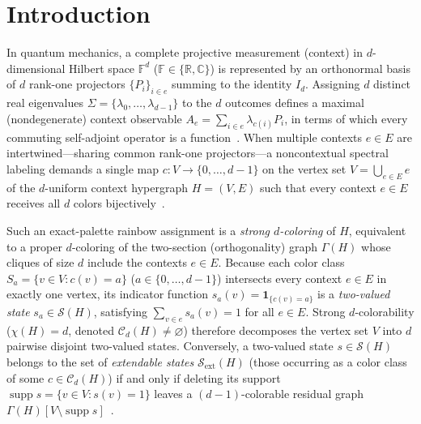 \documentclass[aps,pra,reprint,superscriptaddress,longbibliography,nofootinbib,floatfix,10pt]{revtex4-2}
\theoremstyle{definition}\newtheorem{definition}[theorem]{Definition}
\theoremstyle{remark}\newtheorem{remark}[theorem]{Remark}
\newcommand{\C}{\mathbb C}\newcommand{\R}{\mathbb R}\newcommand{\Q}{\mathbb Q}
\newcommand{\F}{\mathbb F}\newcommand{\Z}{\mathbb Z}\newcommand{\PP}{\mathbb P}
\newcommand{\Sc}{\mathcal S}\newcommand{\Cc}{\mathcal C}
\DeclareMathOperator{\supp}{supp}\DeclareMathOperator{\conv}{conv}
\begin{document}
\maketitle

\section{Introduction}\label{sec:intro}

In quantum mechanics, a complete projective measurement (context) in $d$-dimensional Hilbert space $\F^d$ ($\F\in\{\R,\C\}$) is represented by an orthonormal basis of $d$ rank-one projectors $\{P_i\}_{i\in e}$ summing to the identity $I_d$. Assigning $d$ distinct real eigenvalues $\Sigma=\{\lambda_0,\ldots,\lambda_{d-1}\}$ to the $d$ outcomes defines a maximal (nondegenerate) context observable $A_e=\sum_{i\in e}\lambda_{c(i)}P_i$, in terms of which every commuting self-adjoint operator is a function~\cite{v-neumann-31,halmos-vs}. When multiple contexts $e\in E$ are intertwined—sharing common rank-one projectors—a noncontextual spectral labeling demands a single map $c:V\to\{0,\ldots,d-1\}$ on the vertex set $V=\bigcup_{e\in E}e$ of the $d$-uniform context hypergraph $H=(V,E)$ such that every context $e\in E$ receives all $d$ colors bijectively~\cite{svozil-2020-c,svozil-2021-chroma,svozil-2025-color}.

Such an exact-palette rainbow assignment is a \emph{strong $d$-coloring} of $H$, equivalent to a proper $d$-coloring of the two-section (orthogonality) graph $\Gamma(H)$ whose cliques of size $d$ include the contexts $e\in E$. Because each color class $S_a=\{v\in V:c(v)=a\}$ ($a\in\{0,\ldots,d-1\}$) intersects every context $e\in E$ in exactly one vertex, its indicator function $s_a(v)=\mathbf{1}_{\{c(v)=a\}}$ is a \emph{two-valued state} $s_a\in\Sc(H)$, satisfying $\sum_{v\in e}s_a(v)=1$ for all $e\in E$. Strong $d$-colorability ($\chi(H)=d$, denoted $\Cc_d(H)\neq\varnothing$) therefore decomposes the vertex set $V$ into $d$ pairwise disjoint two-valued states. Conversely, a two-valued state $s\in\Sc(H)$ belongs to the set of \emph{extendable states} $\Sc_{\mathrm{ext}}(H)$ (those occurring as a color class of some $c\in\Cc_d(H)$) if and only if deleting its support $\supp s=\{v\in V:s(v)=1\}$ leaves a $(d-1)$-colorable residual graph $\Gamma(H)[V\setminus\supp s]$~\cite{svozil-2025-color}.
\end{document}
